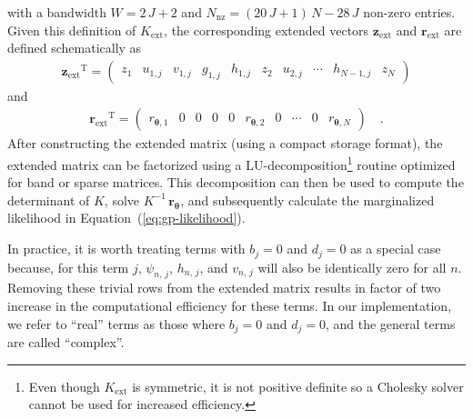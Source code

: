 \documentclass[manuscript, letterpaper]{aastex6}
\renewcommand{\eqref}[1]{\ref{eq:#1}}
\newcommand{\Eq}[1]{Equation~(\eqref{#1})}
\newcommand{\eq}[1]{\Eq{#1}}
\newcommand{\T}{\ensuremath{\mathrm{T}}}
\newcommand{\bvec}[1]{{\ensuremath{\boldsymbol{#1}}}}
\begin{document}
with a bandwidth $W = 2\,J+2$ and $N_\mathrm{nz} = (20\,J+1)\,N-28\,J$
non-zero entries.
Given this definition of $K_\mathrm{ext}$, the corresponding extended vectors
$\bvec{z}_\mathrm{ext}$ and $\bvec{r}_\mathrm{ext}$ are defined schematically
as
\begin{eqnarray}
{\bvec{z}_\mathrm{ext}} ^\T =
\left(\begin{array}{cccccccccc}
    z_1 & u_{1,j} & v_{1,j} & g_{1,j} & h_{1,j} & z_2 & u_{2,j} & \cdots &
    h_{N-1,j} & z_N
\end{array}\right)
\end{eqnarray}
and
\begin{eqnarray}
{\bvec{r}_\mathrm{ext}} ^\T =
\left(\begin{array}{cccccccccc}
    r_{\bvec{\theta},1} & 0 & 0 & 0 & 0 & r_{\bvec{\theta},2} &
    0 & \cdots & 0 & r_{\bvec{\theta},N}
\end{array}\right) \quad.
\end{eqnarray}
After constructing the extended matrix (using a compact storage format), the
extended matrix can be factorized using a LU-decomposition\footnote{Even
though $K_\mathrm{ext}$ is symmetric, it is not positive definite so a
Cholesky solver cannot be used for increased efficiency.} routine optimized
for band or sparse matrices.
This decomposition can then be used to compute the determinant of $K$, solve
$K^{-1}\,\bvec{r}_\bvec{\theta}$, and subsequently calculate the marginalized
likelihood in \eq{gp-likelihood}.

In practice, it is worth treating terms with $b_j=0$ and $d_j=0$ as a special
case because, for this term $j$, $\psi_{n,\,j}$, $h_{n,\,j}$, and $v_{n,\,j}$
will also be identically zero for all $n$.
Removing these trivial rows from the extended matrix results in factor of two
increase in the computational efficiency for these terms.
In our implementation, we refer to ``real'' terms as those where $b_j=0$ and
$d_j=0$, and the general terms are called ``complex''.
\end{document}
